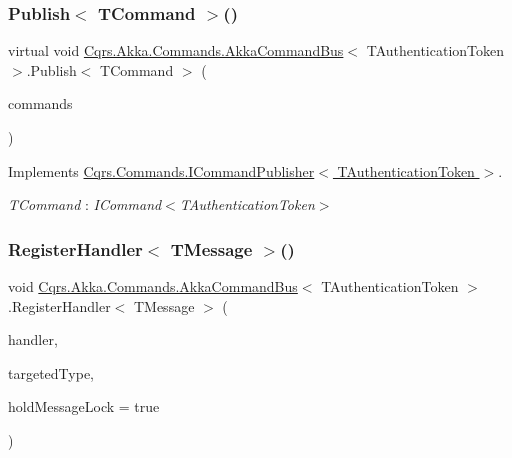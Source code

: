 \subsubsection{\texorpdfstring{Publish$<$ T\+Command $>$()}{Publish< TCommand >()}\hspace{0.1cm}{\footnotesize\ttfamily [2/2]}}
{\footnotesize\ttfamily virtual void \hyperlink{classCqrs_1_1Akka_1_1Commands_1_1AkkaCommandBus}{Cqrs.\+Akka.\+Commands.\+Akka\+Command\+Bus}$<$ T\+Authentication\+Token $>$.Publish$<$ T\+Command $>$ (\begin{DoxyParamCaption}\item[{I\+Enumerable$<$ T\+Command $>$}]{commands }\end{DoxyParamCaption})\hspace{0.3cm}{\ttfamily [virtual]}}



Implements \hyperlink{interfaceCqrs_1_1Commands_1_1ICommandPublisher_af0f033c0b949e5650032e4f00b11b595_af0f033c0b949e5650032e4f00b11b595}{Cqrs.\+Commands.\+I\+Command\+Publisher$<$ T\+Authentication\+Token $>$}.

\begin{Desc}
\item[Type Constraints]\begin{description}
\item[{\em T\+Command} : {\em I\+Command$<$T\+Authentication\+Token$>$}]\end{description}
\end{Desc}
\mbox{\label{classCqrs_1_1Akka_1_1Commands_1_1AkkaCommandBus_a8ed33fb315493d52470bc3bc2bf076f2_a8ed33fb315493d52470bc3bc2bf076f2}} 
\subsubsection{\texorpdfstring{Register\+Handler$<$ T\+Message $>$()}{RegisterHandler< TMessage >()}\hspace{0.1cm}{\footnotesize\ttfamily [1/2]}}
{\footnotesize\ttfamily void \hyperlink{classCqrs_1_1Akka_1_1Commands_1_1AkkaCommandBus}{Cqrs.\+Akka.\+Commands.\+Akka\+Command\+Bus}$<$ T\+Authentication\+Token $>$.Register\+Handler$<$ T\+Message $>$ (\begin{DoxyParamCaption}\item[{Action$<$ T\+Message $>$}]{handler,  }\item[{Type}]{targeted\+Type,  }\item[{bool}]{hold\+Message\+Lock = {\ttfamily true} }\end{DoxyParamCaption})}



